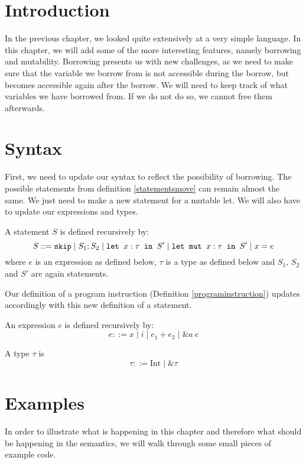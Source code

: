 \section{Introduction}
In the previous chapter, we looked quite extensively at a very simple language. In this chapter, we will add some of the more interesting features, namely borrowing and mutability. Borrowing presents us with new challenges, as we need to make sure that the variable we borrow from is not accessible during the borrow, but becomes accessible again after the borrow. We will need to keep track of what variables we have borrowed from. If we do not do so, we cannot free them afterwards. 

\section{Syntax}
First, we need to update our syntax to reflect the possibility of borrowing. The possible statements from definition \ref{statementsmove} can remain almost the same. We just need to make a new statement for a mutable let. We will also have to update our expressions and types. 

\begin{definition}
\label{statementsborrow}
A statement $S$ is defined recursively by:
$$S ::= \texttt{skip} \mid S_1; S_2 \mid \texttt{let }x : \tau \texttt{ in } S' \mid \texttt{let mut }x : \tau \texttt{ in } S' \mid x = e $$
where $e$ is an expression as defined below, $\tau$ is a type as defined below and $S_1$, $S_2$ and $S'$ are again statements.
\end{definition}

Our definition of a program instruction (Definition \ref{programinstruction}) updates accordingly with this new definition of a statement. 

\begin{definition}
\label{expressionsborrow}
An expression $e$ is defined recursively by:
$$e ::= x \mid i \mid e_1 + e_2 \mid \&a~e$$
\end{definition}

\begin{definition}
\label{typesborrow}
A type $\tau$ is
$$\tau ::= \textrm{Int} \mid \& \tau$$
\end{definition}

\section{Examples}

In order to illustrate what is happening in this chapter and therefore what should be happening in the semantics, we will walk through some small pieces of example code. 

